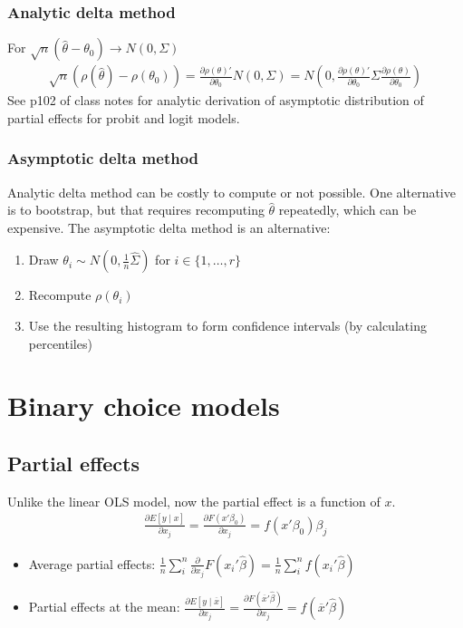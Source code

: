 \documentclass{article}
\begin{document}
\subsubsection{Analytic delta method}
For $\sqrt{n}(\hat{\theta} - \theta_0) \longrightarrow N(0, \Sigma)$
\begin{align*}
  \sqrt{n}(\rho(\hat{\theta}) - \rho(\theta_0)) = \frac{\partial\rho(\theta)'}{\partial \theta_0}N(0, \Sigma) = N\left(0, \frac{\partial\rho(\theta)'}{\partial \theta_0} \Sigma \frac{\partial\rho(\theta)}{\partial \theta_0}\right)
\end{align*}
See p102 of class notes for analytic derivation of asymptotic distribution of partial effects for probit and logit models.

\subsubsection{Asymptotic delta method}
Analytic delta method can be costly to compute or not possible. One alternative is to bootstrap, but that requires recomputing $\hat{\theta}$ repeatedly, which can be expensive. The asymptotic delta method is an alternative:

\begin{enumerate}
  \item Draw $\theta_i \sim N(0, \frac{1}{n}\hat{\Sigma})$ for $i \in \{1, \dots, r\}$
  \item Recompute $\rho(\theta_i)$
  \item Use the resulting histogram to form confidence intervals (by calculating percentiles)
\end{enumerate}









\section{Binary choice models}

\subsection{Partial effects}
Unlike the linear OLS model, now the partial effect is a function of $x$.
\begin{align*}
  \frac{\partial E[y\mid x]}{\partial x_j} = \frac{\partial F(x'\beta_0)}{\partial x_j} = f(x'\beta_0)\beta_j
\end{align*}
\begin{itemize}
  \item Average partial effects: $\frac{1}{n}\sum_i^n\frac{\partial}{\partial x_j}F(x_i'\hat{\beta}) = \frac{1}{n}\sum_i^nf(x_i'\hat{\beta})$
  \item Partial effects at the mean: $\frac{\partial E[y \mid \overline{x}]}{\partial x_j} = \frac{\partial F(\overline{x}'\hat{\beta})}{\partial x_j} = f(\overline{x}'\hat{\beta})$
\end{itemize}
\end{document}
